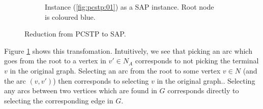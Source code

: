 \begin{figure}[h]
\begin{subfigure}[t]{0.47\linewidth}
    \caption{Instance (\ref{fig:pcstp:01}) as a SAP instance. Root node is coloured blue.}
  \end{subfigure}
  \caption{Reduction from PCSTP to SAP.}
  \label{fig:scip:pcstptosap}
\end{figure}

Figure \ref{fig:scip:pcstptosap} shows this transfomation. Intuitively, we see that
picking an arc which goes from the root to a vertex in $v' \in N_A$
corresponds to not picking the terminal $v$ in the original graph. Selecting an arc from the root
to some vertex $v \in N$ (and the arc $(v, v')$) then corresponds to selecting $v$
in the original graph.. Selecting any arcs between two vertices which are found in $G$ corresponds
directly to selecting the corresponding edge in $G$.

